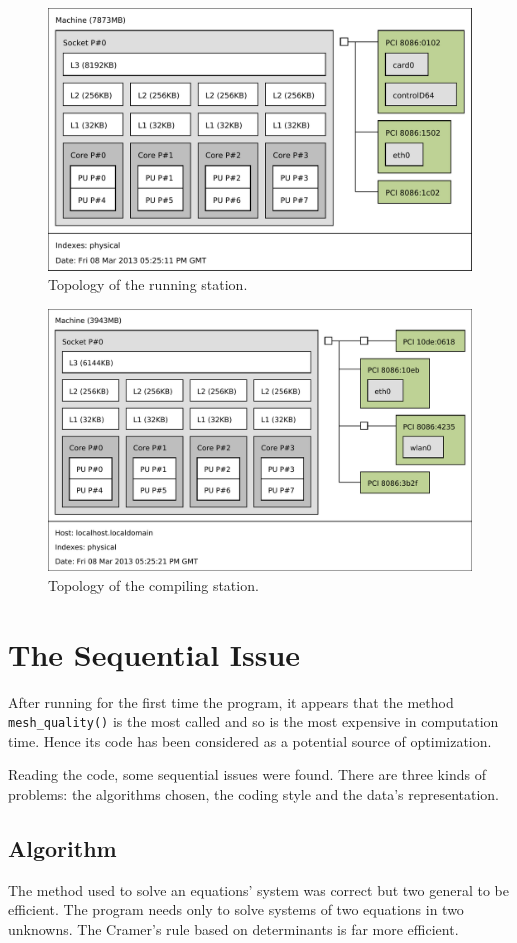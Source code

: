 \documentclass[fleqn,11pt]{SelfArx} %
\begin{document}
\begin{figure}[h]
	\centering

	\includegraphics[width=.48\textwidth]{run.pdf}

	\caption{Topology of the running station.}
	\label{topo}
\end{figure}

\begin{figure}[h]
	\centering

	\includegraphics[width=.48\textwidth]{compile.pdf}

	\caption{Topology of the compiling station.}
	\label{topo}
\end{figure}


\FloatBarrier
\section{The Sequential Issue}

After running for the first time the program, it appears that the method \verb+mesh_quality()+ is the most called and so is the most expensive in computation time. Hence its code has been considered as a potential source of optimization.

Reading the code, some sequential issues were found. There are three kinds of problems: the algorithms chosen, the coding style and the data's representation.

\subsection{Algorithm}

The method used to solve an equations' system was correct but two general to be efficient. The program needs only to solve systems of two equations in two unknowns. The Cramer's rule based on determinants is far more efficient.
\end{document}
